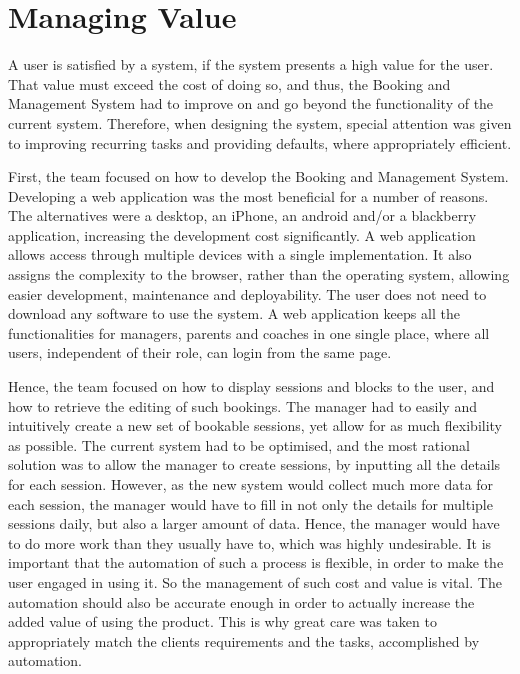 \documentclass{l3proj}
\begin{document}
\section{Managing Value}
\par
A user is satisfied by a system, if the system presents a high value for the user. That value must exceed the cost of doing so, and thus, the Booking and Management System had  to improve on and go beyond the functionality of the current system. Therefore, when designing the system, special attention was given to improving recurring tasks and providing defaults, where appropriately efficient.
\par First, the team focused on how to develop the Booking and Management System. Developing a web application was the most beneficial for a number of reasons. The alternatives were a desktop, an iPhone, an android and/or a blackberry application, increasing the development cost significantly. A web application allows access through multiple devices with a single implementation. It also assigns the complexity to the browser, rather than the operating system, allowing easier development, maintenance and deployability. The user does not need to download any software to use the system. A web application keeps all the functionalities for managers, parents and coaches in one single place, where all users, independent of their role, can login from the same page.
\par Hence, the team focused on how to display sessions and blocks to the user, and how to retrieve the editing of such bookings. The manager had to easily and intuitively create a new set of bookable sessions, yet allow for as much flexibility as possible. The current system had to be optimised, and the most rational solution was to allow the manager to create sessions, by inputting all the details for each session. However, as the new system would collect much more data for each session, the manager would have to fill in not only the details for multiple sessions daily, but also a larger amount of data. Hence, the manager would have to do more work than they usually have to, which was highly undesirable. It is important that the automation of such a process is flexible, in order to make the user engaged in using it. So the management of such cost and value is vital. The automation should also be accurate enough in order to actually increase the added value of using the product. This is why great care was taken to appropriately match the clients requirements and the tasks, accomplished by automation.
\end{document}
